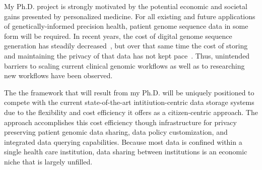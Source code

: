 \documentclass[a4paper,11pt]{article}
\begin{document}
\begin{refsection}
\begin{comment}
Societal impact should always be linked to a (in)direct (macro)economic benefit, e.g. cost reductions in health care, higher education level, environmental impact etc. should be positioned in an economic context.
\end{comment}
\smallskip

My Ph.D. project is strongly motivated by the potential economic and societal gains presented by personalized medicine. 
For all existing and future applications of genetically-informed precision health, patient genome sequence data in some form will be required.
In recent years, the cost of digital genome sequence generation has steadily decreased~\cite{wetterstrand_cost_2021}, but over that same time the cost of storing and maintaining the privacy of that data has not kept pace~\cite{}.
Thus, unintended barriers to scaling current clinical genomic workflows as well as to researching new workflows have been observed.

The the framework that will result from my Ph.D. will be uniquely positioned to compete with the current state-of-the-art intitiution-centric data storage systems due to the flexibility and cost efficiency it offers as a citizen-centric approach.
The approach accomplishes this cost efficiency though infrastructure for privacy preserving patient genomic data sharing, data policy customization, and integrated data querying capabilities.
Because most data is confined within a single health care institution, data sharing between institutions is an economic niche that is largely unfilled. 


\end{refsection}
\end{document}
